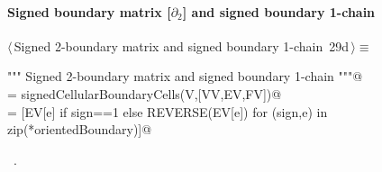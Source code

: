 \documentclass[11pt,oneside]{article}	%
\begin{document}
\paragraph{Signed boundary matrix [$\partial_2$] and signed boundary 1-chain}
\begin{flushleft} \small \label{scrap51}
\protect{}$\langle\,$Signed 2-boundary matrix and signed boundary 1-chain\nobreak\ {\footnotesize 29d}$\,\rangle\equiv$
\vspace{-1ex}
\begin{list}{}{} \item
\mbox{}\verb@""" Signed 2-boundary matrix  and signed boundary 1-chain """@\\
\mbox{}\verb@orientedBoundary = signedCellularBoundaryCells(V,[VV,EV,FV])@\\
\mbox{}\verb@cells = [EV[e] if sign==1 else REVERSE(EV[e]) for (sign,e) in zip(*orientedBoundary)]@\\
\mbox{}\verb@@{\NWsep}
\end{list}
\vspace{-1ex}
\footnotesize\addtolength{\baselineskip}{-1ex}
\begin{list}{}{\setlength{\itemsep}{-\parsep}\setlength{\itemindent}{-\leftmargin}}
\item \NWtxtMacroRefIn\ .
\end{list}
\end{flushleft}
\end{document}
